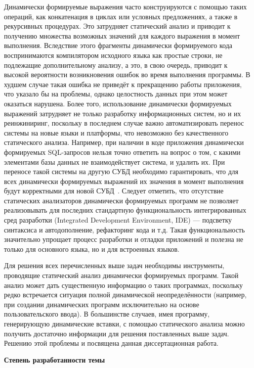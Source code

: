 Динамически формируемые выражения часто конструируются с помощью таких операций, как конкатенация в циклах или условных предложениях, а также в рекурсивных процедурах. Это затрудняет статический анализ и приводит к получению множества возможных значений для каждого выражения в момент выполнения. Вследствие этого фрагменты динамически формируемого кода воспринимаются компилятором исходного языка как простые строки, не подлежащие дополнительному анализу, а это, в свою очередь, приводит к высокой вероятности возникновения ошибок во время выполнения программы. В худшем случае такая ошибка не приведёт к прекращению работы приложения, что указало бы на проблемы, однако целостность данных при этом может оказаться нарушена. Более того, использование динамически формируемых выражений затрудняет не только разработку информационных систем, но и их реинжиниринг, поскольку в последнем случае важно автоматизировать перенос системы на новые языки и платформы, что невозможно без качественного статического анализа. Например, при наличии в коде приложения динамически формируемых SQL-запросов нельзя точно ответить на вопрос о том, с какими элементами базы данных не взаимодействует система, и удалить их. При переносе такой системы на другую СУБД необходимо гарантировать, что для всех динамически формируемых выражений их значения в момент выполнения будут корректными для новой СУБД~\cite{JSquash}. Следует отметить, что отсутствие статических анализаторов динамически формируемых программ не позволяет реализовывать для последних стандартную функциональность интегрированных сред разработки (Integrated Development Environment, IDE) --- подсветку синтаксиса и автодополнение, рефакторинг кода и т.д. Такая функциональность значительно упрощает процесс разработки и отладки приложений и полезна не только для основного языка, но и для встроенных языков. 

Для решения всех перечисленных выше задач необходимы инструменты, проводящие статический анализ динамически формируемых программ. Такой анализ может дать существенную информацию о таких программах, поскольку редко встречается ситуация полной динамической неопределённости (например, при создании динамических программ исключительно на основе пользовательского ввода). В большинстве случаев, имея программу, генерирующую динамические вставки, с помощью статического анализа можно получить достаточно информации для решения поставленных выше задач. Решению этой проблемы и посвящена данная диссертационная работа. 


\textbf{Степень разработанности темы}

